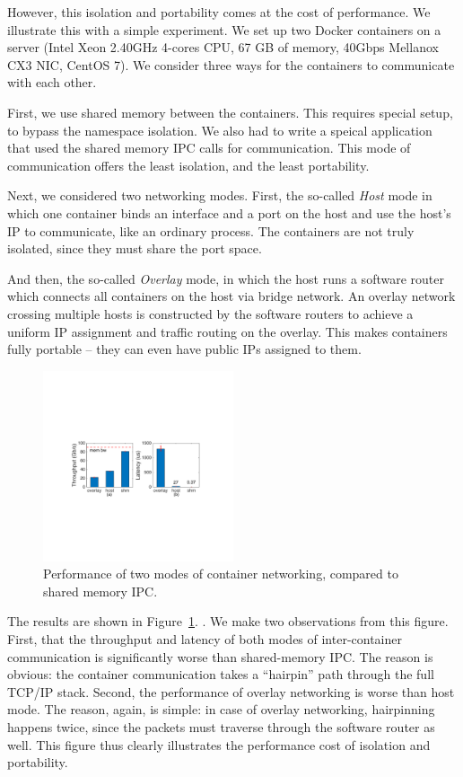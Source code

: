 However, this isolation and portability comes at the cost of performance. We
illustrate this with a simple experiment.  We set up two Docker containers on a
server (Intel Xeon 2.40GHz 4-cores CPU, 67 GB of memory, 40Gbps Mellanox CX3
NIC, CentOS 7). We consider three ways for the containers to communicate with
each other. 

First, we use shared memory between the containers. This requires special setup,
to bypass the namespace isolation. We also had to write a speical application
that used the shared memory IPC calls for communication. This mode of
communication offers the least isolation, and the least portability. 

Next, we considered two networking modes. First, the so-called {\em Host} mode
in which one container binds an interface and a port on the host and use the
host's IP to communicate, like an ordinary process.  The containers are not
truly isolated, since they must share the port space.

And then, the so-called {\em Overlay} mode, in which the host runs a software
router which connects all containers on the host via bridge network. An overlay
network crossing multiple hosts is constructed by the software routers to
achieve a uniform IP assignment and traffic routing on the overlay. This makes
containers fully portable -- they can even have public IPs assigned to them. 

\begin{figure}[ht]
     \centering 
     \includegraphics[width=0.5\textwidth]{figures/intro/intro_exist2.pdf} 
     \caption{Performance of two modes of container networking, compared to
     shared memory IPC.} 
     \label{fig:three_modes} 
\end{figure} 

The results are shown in Figure~\ref{fig:three_modes}. . We make two observations from this figure. First, that the throughput and
latency of both modes of inter-container communication is significantly worse
than shared-memory IPC. The reason is obvious: the container communication takes
a ``hairpin'' path through the full TCP/IP stack. Second, the performance of
overlay networking is worse than host mode. The reason, again, is simple: in
case of overlay networking, hairpinning happens twice, since the packets must
traverse through the software router as well. This figure thus clearly
illustrates the performance cost of isolation and portability.

